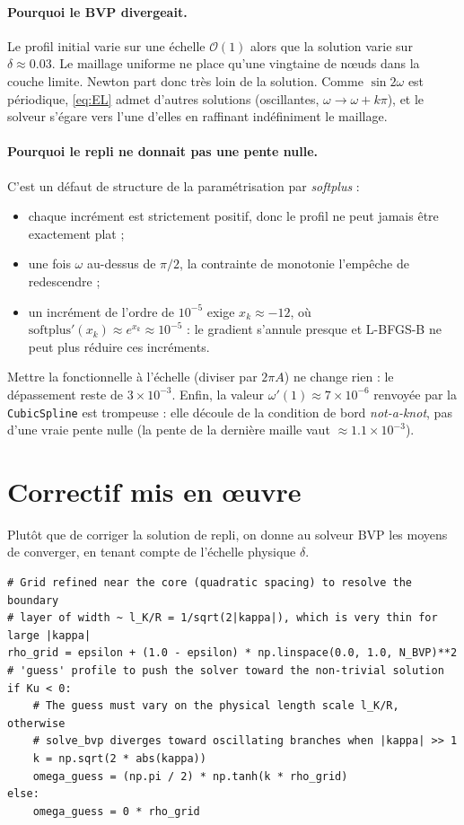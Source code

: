 \documentclass[11pt,a4paper]{article}
\begin{document}
\paragraph{Pourquoi le BVP divergeait.}
Le profil initial varie sur une échelle $\mathcal{O}(1)$ alors que la
solution varie sur $\delta\approx0.03$. Le maillage uniforme ne place qu'une
vingtaine de nœuds dans la couche limite. Newton part donc très loin de la
solution. Comme $\sin 2\omega$ est périodique, \eqref{eq:EL} admet d'autres
solutions (oscillantes, $\omega \to \omega + k\pi$), et le solveur s'égare
vers l'une d'elles en raffinant indéfiniment le maillage.

\paragraph{Pourquoi le repli ne donnait pas une pente nulle.}
C'est un défaut de structure de la paramétrisation par \emph{softplus} :
\begin{itemize}
  \item chaque incrément est strictement positif, donc le profil ne peut
        jamais être exactement plat ;
  \item une fois $\omega$ au-dessus de $\pi/2$, la contrainte de monotonie
        l'empêche de redescendre ;
  \item un incrément de l'ordre de $10^{-5}$ exige $x_k\approx-12$, où
        $\mathrm{softplus}'(x_k)\approx e^{x_k}\approx 10^{-5}$ : le gradient
        s'annule presque et L-BFGS-B ne peut plus réduire ces incréments.
\end{itemize}
Mettre la fonctionnelle à l'échelle (diviser par $2\pi A$) ne change rien :
le dépassement reste de $3\times10^{-3}$.
Enfin, la valeur $\omega'(1)\approx7\times10^{-6}$ renvoyée par la
\texttt{CubicSpline} est trompeuse : elle découle de la condition de bord
\emph{not-a-knot}, pas d'une vraie pente nulle (la pente de la dernière
maille vaut $\approx 1.1\times10^{-3}$).

\section{Correctif mis en œuvre}

Plutôt que de corriger la solution de repli, on donne au solveur BVP les moyens de
converger, en tenant compte de l'échelle physique $\delta$.

\begin{lstlisting}
# Grid refined near the core (quadratic spacing) to resolve the boundary
# layer of width ~ l_K/R = 1/sqrt(2|kappa|), which is very thin for large |kappa|
rho_grid = epsilon + (1.0 - epsilon) * np.linspace(0.0, 1.0, N_BVP)**2
# 'guess' profile to push the solver toward the non-trivial solution
if Ku < 0:
    # The guess must vary on the physical length scale l_K/R, otherwise
    # solve_bvp diverges toward oscillating branches when |kappa| >> 1
    k = np.sqrt(2 * abs(kappa))
    omega_guess = (np.pi / 2) * np.tanh(k * rho_grid)
else:
    omega_guess = 0 * rho_grid
\end{lstlisting}
\end{document}
